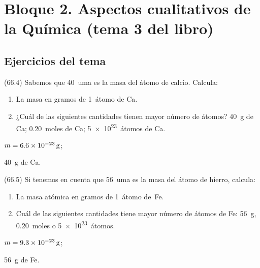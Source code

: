 \section{Bloque 2. Aspectos cualitativos de la Química (tema 3 del libro)}

  \subsection*{Ejercicios del tema}

    \begin{exercise}[
        tags    = {},
        topics  = {química,química básica},
        source  = {FQ 1B MGH 2016, p66, e4},
      ]
      (66.4) Sabemos que \SI{40}{uma} es la masa del átomo de calcio. Calcula:
      \begin{enumerate}
        \item La masa en gramos de \SI{1}{átomo} de Ca.
        \item ¿Cuál de las siguientes cantidades tienen mayor número de átomos? \SI{40}{g} de Ca; \SI{0,20}{moles} de Ca; \SI{5e23}{átomos} de Ca.
      \end{enumerate}
    \end{exercise}

    \begin{solution}
      \begin{enumerate*}
        \item \( m = \SI{6,6E-23}{\gram} \);
        \item \SI{40}{\gram} de Ca.
      \end{enumerate*}
    \end{solution}




    \begin{exercise}[
        tags    = {},
        topics  = {química,química básica},
        source  = {FQ 1B MGH 2016, p66, e5},
      ]
      (66.5) Si tenemos en cuenta que \SI{56}{uma} es la masa del átomo de hierro, calcula:
      \begin{enumerate}
        \item La masa atómica en gramos de \SI{1}{átomo} de~Fe.
        \item Cuál de las siguientes cantidades tiene mayor número de átomos de Fe: \SI{56}{\gram}, \SI{0,20}{moles} o \SI{5e23}{átomos}.
      \end{enumerate}
    \end{exercise}

    \begin{solution}
      \begin{enumerate*}
        \item \( m = \SI{9,3E-23}{\gram} \);
        \item \SI{56}{\gram} de Fe.
      \end{enumerate*}
    \end{solution}





